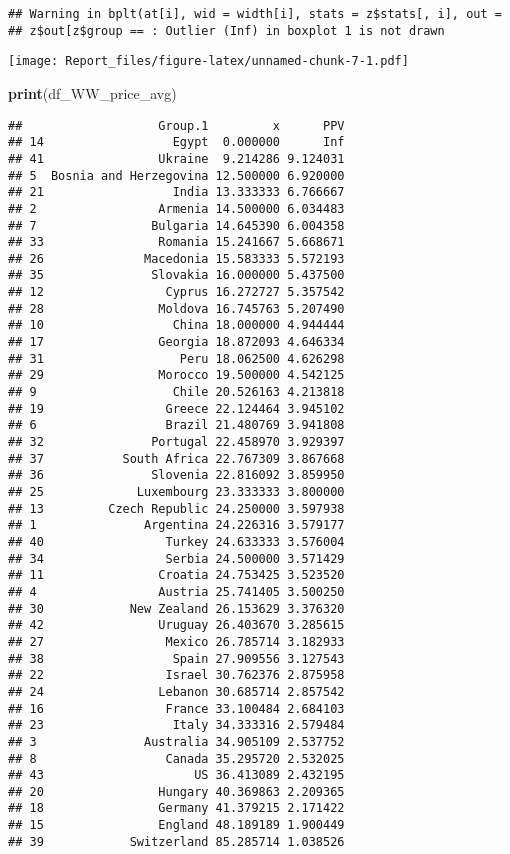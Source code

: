\documentclass[
]{article}
\newenvironment{Shaded}{\begin{snugshade}}{\end{snugshade}}
\newcommand{\FunctionTok}[1]{\textcolor[rgb]{0.13,0.29,0.53}{\textbf{#1}}}
\newcommand{\NormalTok}[1]{#1}
\begin{document}
\begin{verbatim}
## Warning in bplt(at[i], wid = width[i], stats = z$stats[, i], out =
## z$out[z$group == : Outlier (Inf) in boxplot 1 is not drawn
\end{verbatim}

\texttt{[image: Report\_files/figure-latex/unnamed-chunk-7-1.pdf]}

\begin{Shaded}
\begin{Highlighting}[]
\FunctionTok{print}\NormalTok{(df\_WW\_price\_avg)}
\end{Highlighting}
\end{Shaded}

\begin{verbatim}
##                   Group.1         x      PPV
## 14                  Egypt  0.000000      Inf
## 41                Ukraine  9.214286 9.124031
## 5  Bosnia and Herzegovina 12.500000 6.920000
## 21                  India 13.333333 6.766667
## 2                 Armenia 14.500000 6.034483
## 7                Bulgaria 14.645390 6.004358
## 33                Romania 15.241667 5.668671
## 26              Macedonia 15.583333 5.572193
## 35               Slovakia 16.000000 5.437500
## 12                 Cyprus 16.272727 5.357542
## 28                Moldova 16.745763 5.207490
## 10                  China 18.000000 4.944444
## 17                Georgia 18.872093 4.646334
## 31                   Peru 18.062500 4.626298
## 29                Morocco 19.500000 4.542125
## 9                   Chile 20.526163 4.213818
## 19                 Greece 22.124464 3.945102
## 6                  Brazil 21.480769 3.941808
## 32               Portugal 22.458970 3.929397
## 37           South Africa 22.767309 3.867668
## 36               Slovenia 22.816092 3.859950
## 25             Luxembourg 23.333333 3.800000
## 13         Czech Republic 24.250000 3.597938
## 1               Argentina 24.226316 3.579177
## 40                 Turkey 24.633333 3.576004
## 34                 Serbia 24.500000 3.571429
## 11                Croatia 24.753425 3.523520
## 4                 Austria 25.741405 3.500250
## 30            New Zealand 26.153629 3.376320
## 42                Uruguay 26.403670 3.285615
## 27                 Mexico 26.785714 3.182933
## 38                  Spain 27.909556 3.127543
## 22                 Israel 30.762376 2.875958
## 24                Lebanon 30.685714 2.857542
## 16                 France 33.100484 2.684103
## 23                  Italy 34.333316 2.579484
## 3               Australia 34.905109 2.537752
## 8                  Canada 35.295720 2.532025
## 43                     US 36.413089 2.432195
## 20                Hungary 40.369863 2.209365
## 18                Germany 41.379215 2.171422
## 15                England 48.189189 1.900449
## 39            Switzerland 85.285714 1.038526
\end{verbatim}
\end{document}

